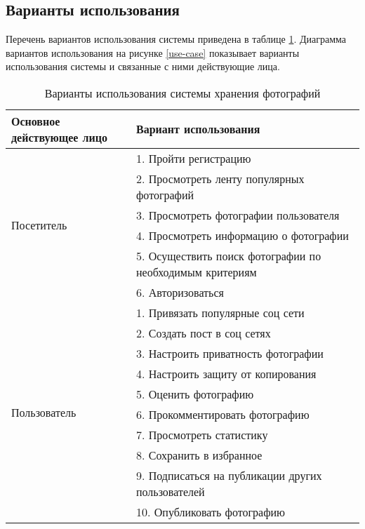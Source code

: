 \subsection{Варианты использования}
Перечень вариантов использования системы приведена в таблице \ref{use-case-table}.
Диаграмма вариантов использования на рисунке \ref{use-case} показывает варианты использования системы и связанные с ними действующие лица.

\begin{table}[H]
  \caption{\onehalfspacing Варианты использования системы хранения фотографий}\label{use-case-table}
  \begin{tabular}{|p{6cm}|p{10cm}|}
  \hline Основное действующее лицо & Вариант использования \\
  \hline \multirow{6}{*}{Посетитель} & 1. Пройти регистрацию \\
  \cline{2-2} & 2. Просмотреть ленту популярных фотографий \\
  \cline{2-2} & 3. Просмотреть фотографии пользователя \\
  \cline{2-2} & 4. Просмотреть информацию о фотографии \\
  \cline{2-2} & 5. Осуществить поиск фотографии по необходимым критериям \\
  \cline{2-2} & 6. Авторизоваться \\
  \hline \multirow{10}{*}{Пользователь} & 1. Привязать популярные соц сети \\
  \cline{2-2} & 2. Создать пост в соц сетях \\
  \cline{2-2} & 3. Настроить приватность фотографии \\
  \cline{2-2} & 4. Настроить защиту от копирования \\
  \cline{2-2} & 5. Оценить фотографию \\
  \cline{2-2} & 6. Прокомментировать фотографию \\
  \cline{2-2} & 7. Просмотреть статистику \\
  \cline{2-2} & 8. Сохранить в избранное \\
  \cline{2-2} & 9. Подписаться на публикации других пользователей \\
  \cline{2-2} & 10. Опубликовать фотографию \\
  \hline
  \end{tabular}
\end{table}

